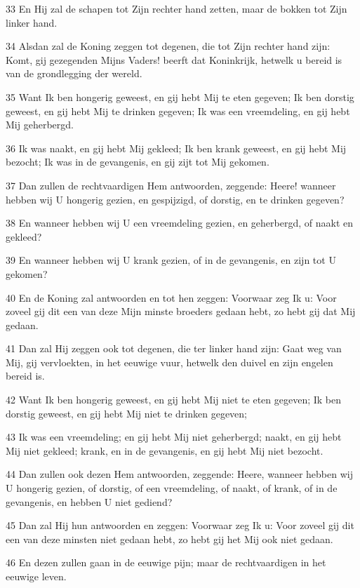 \par 33 En Hij zal de schapen tot Zijn rechter hand zetten, maar de bokken tot Zijn linker hand.
\par 34 Alsdan zal de Koning zeggen tot degenen, die tot Zijn rechter hand zijn: Komt, gij gezegenden Mijns Vaders! beerft dat Koninkrijk, hetwelk u bereid is van de grondlegging der wereld.
\par 35 Want Ik ben hongerig geweest, en gij hebt Mij te eten gegeven; Ik ben dorstig geweest, en gij hebt Mij te drinken gegeven; Ik was een vreemdeling, en gij hebt Mij geherbergd.
\par 36 Ik was naakt, en gij hebt Mij gekleed; Ik ben krank geweest, en gij hebt Mij bezocht; Ik was in de gevangenis, en gij zijt tot Mij gekomen.
\par 37 Dan zullen de rechtvaardigen Hem antwoorden, zeggende: Heere! wanneer hebben wij U hongerig gezien, en gespijzigd, of dorstig, en te drinken gegeven?
\par 38 En wanneer hebben wij U een vreemdeling gezien, en geherbergd, of naakt en gekleed?
\par 39 En wanneer hebben wij U krank gezien, of in de gevangenis, en zijn tot U gekomen?
\par 40 En de Koning zal antwoorden en tot hen zeggen: Voorwaar zeg Ik u: Voor zoveel gij dit een van deze Mijn minste broeders gedaan hebt, zo hebt gij dat Mij gedaan.
\par 41 Dan zal Hij zeggen ook tot degenen, die ter linker hand zijn: Gaat weg van Mij, gij vervloekten, in het eeuwige vuur, hetwelk den duivel en zijn engelen bereid is.
\par 42 Want Ik ben hongerig geweest, en gij hebt Mij niet te eten gegeven; Ik ben dorstig geweest, en gij hebt Mij niet te drinken gegeven;
\par 43 Ik was een vreemdeling; en gij hebt Mij niet geherbergd; naakt, en gij hebt Mij niet gekleed; krank, en in de gevangenis, en gij hebt Mij niet bezocht.
\par 44 Dan zullen ook dezen Hem antwoorden, zeggende: Heere, wanneer hebben wij U hongerig gezien, of dorstig, of een vreemdeling, of naakt, of krank, of in de gevangenis, en hebben U niet gediend?
\par 45 Dan zal Hij hun antwoorden en zeggen: Voorwaar zeg Ik u: Voor zoveel gij dit een van deze minsten niet gedaan hebt, zo hebt gij het Mij ook niet gedaan.
\par 46 En dezen zullen gaan in de eeuwige pijn; maar de rechtvaardigen in het eeuwige leven.

